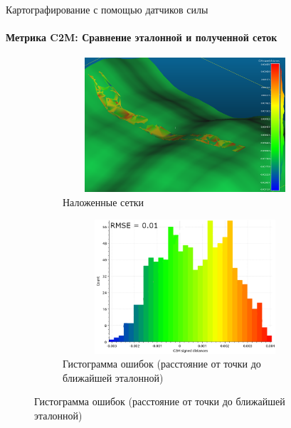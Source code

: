 \documentclass[aspectratio=169,xcolor=table]{beamer}
\begin{document}
\begin{frame}[t]{Картографирование с помощью датчиков силы}
    \framesubtitle{Метрика C2M: Сравнение эталонной и полученной сеток}
    \vspace{-15pt}
    \begin{figure}[H]
        \begin{subfigure}[t]{0.49\textwidth}
            \centering\includegraphics[height=5cm,width=1\textwidth,keepaspectratio]{mesh_comp.png}
            \caption*{Наложенные сетки}
        \end{subfigure}
        \begin{subfigure}[t]{0.49\textwidth}
            \centering\includegraphics[height=5cm,width=1\textwidth,keepaspectratio]{mesh_hist.png}
            \caption*{Гистограмма ошибок (расстояние от точки до ближайшей эталонной)}
        \end{subfigure}
    \end{figure}
\end{frame}
\end{document}
